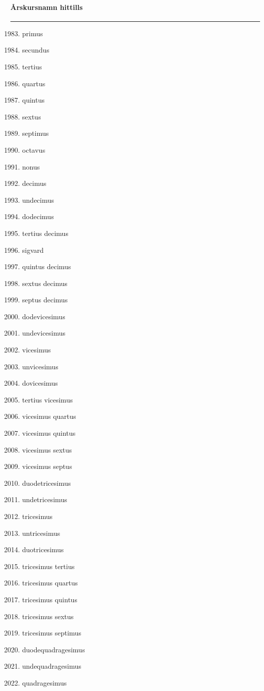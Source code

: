 \begin{song}
\begin{songnotes}
\paragraph{Årskursnamn hittills}
\rule{\textwidth}{0pt}
\begin{multicols}{2}
\begin{enumerate}
\setcounter{enumi}{1982}
\setlength{\itemsep}{0cm}
\setlength{\parskip}{0cm}
\item primus
\item secundus
\item tertius
\item quartus
\item quintus
\item sextus
\item septimus
\item octavus
\item nonus
\item decimus
\item undecimus
\item dodecimus
\item tertius decimus
\item sigvard
\item quintus decimus
\item sextus decimus
\item septus decimus
\item dodevicesimus
\item undevicesimus
\item vicesimus
\item unvicesimus
\item dovicesimus
\item tertius vicesimus
\item vicesimus quartus
\item vicesimus quintus
\item vicesimus sextus
\item vicesimus septus
\item duodetricesimus
\item undetricesimus
\item tricesimus
\item untricesimus
\item duotricesimus
\item tricesimus tertius
\item tricesimus quartus
\item tricesimus quintus
\item tricesimus sextus
\item tricesimus septimus
\item duodequadragesimus
\item undequadragesimus
\item quadragesimus
\end{enumerate}
\end{multicols}
\end{songnotes}

\end{song}
